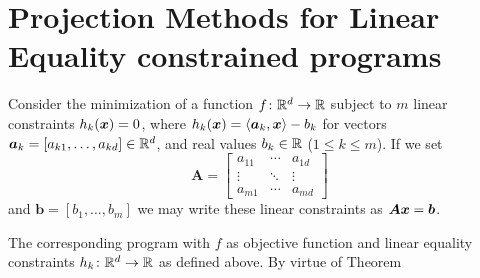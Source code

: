 
\section{Projection Methods for Linear Equality constrained programs}

Consider the minimization of a function $f\colon \mathbb{R}^d \to \mathbb{R}$ subject to $m$ linear constraints $h_k(\boldsymbol{x}) = 0$, where $h_k(\boldsymbol{x}) = \langle \boldsymbol{a}_k , \boldsymbol{x} \rangle - b_k$ for vectors $\boldsymbol{a}_k=[a_{k1}, \dotsc, a_{kd}] \in \mathbb{R}^d$, and real values $b_k \in \mathbb{R}$ ($1\leq k \leq m$).  If we set 
\begin{equation*}
\boldsymbol{A} = \begin{bmatrix} a_{11} & \dotsb & a_{1d} \\ \vdots & \ddots & \vdots \\ a_{m1} & \dotsb & a_{md} \end{bmatrix}
\end{equation*}
and $\boldsymbol{b} = [b_1, \dotsc, b_m]$ we may write these linear constraints as $\boldsymbol{A}\boldsymbol{x}=\boldsymbol{b}$.

The corresponding program with $f$ as objective function and linear equality constraints $h_k\colon \mathbb{R}^d \to \mathbb{R}$ as defined above.  By virtue of Theorem 
